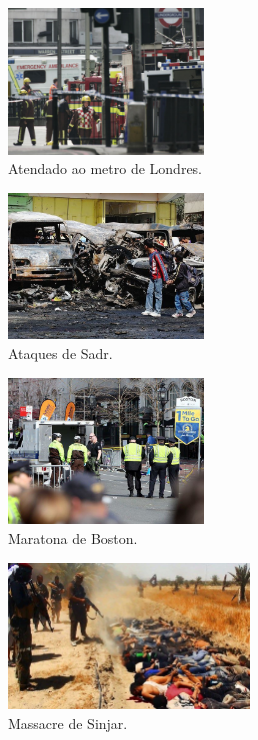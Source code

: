 \documentclass{report}
\begin{document}
\begin{figure}[h]
 \center
 \includegraphics[height=110pt]{imagem7.pdf}
 \caption{Atendado ao metro de Londres.}
 \end{figure}

\begin{figure}[h]
 \center
 \includegraphics[height=110pt]{imagem8.pdf}
 \caption{Ataques de Sadr.}
 \end{figure}
 
\begin{figure}[h]
 \center
 \includegraphics[height=110pt]{imagem9.pdf}
 \caption{Maratona de Boston.}
 \end{figure}
 
\begin{figure}[h]
 \center
 \includegraphics[height=110pt]{imagem10.pdf}
 \caption{Massacre de Sinjar.}
 \end{figure}
\end{document}

